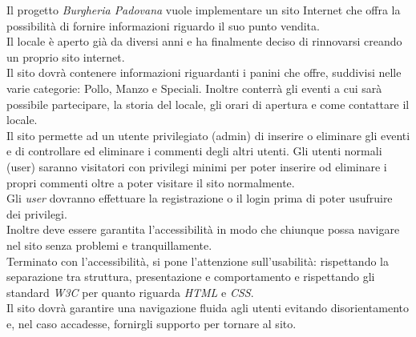 Il progetto \emph{Burgheria Padovana} vuole implementare un sito Internet che offra la possibilità di fornire informazioni riguardo il suo punto vendita.\\
Il locale è aperto già da diversi anni e ha finalmente deciso di rinnovarsi creando un proprio sito internet.\\
Il sito dovrà contenere informazioni riguardanti i panini che offre, suddivisi nelle varie categorie: Pollo, Manzo e Speciali. 
Inoltre conterrà gli eventi a cui sarà possibile partecipare, la storia del locale, gli orari di apertura e come contattare il locale.\\
Il sito permette ad un utente privilegiato (admin) di inserire o eliminare gli eventi e di controllare ed eliminare i commenti degli altri utenti. Gli utenti normali (user) saranno visitatori 
con privilegi minimi per poter inserire od eliminare i propri commenti oltre a poter visitare il sito normalmente.\\
Gli \emph{user} dovranno effettuare la registrazione o il login prima di poter usufruire dei privilegi.\\
Inoltre deve essere garantita l'accessibilità in modo che chiunque possa navigare nel sito senza problemi e tranquillamente.\\
Terminato con l'accessibilità, si pone l'attenzione sull'usabilità: rispettando la separazione tra struttura, presentazione e comportamento e rispettando gli standard \emph{W3C} per quanto riguarda \emph{HTML} e \emph{CSS}.\\
Il sito dovrà garantire una navigazione fluida agli utenti evitando disorientamento e, nel caso accadesse, fornirgli supporto per tornare al sito.\\